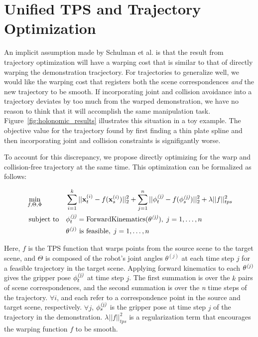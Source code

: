 \section{Unified TPS and Trajectory Optimization}
An implicit assumption made by Schulman et al. is that the result from trajectory optimization will have a warping cost that is similar to that of directly warping the demonstration tracjectory. For trajectories to generalize well, we would like the warping cost that registers both the scene correspondences \emph{and} the new trajectory to be smooth. If incorporating joint and collision avoidance into a trajectory deviates by too much from the warped demonstration, we have no reason to think that it will accomplish the same manipulation task. Figure~\ref{fig:holonomic_results} illustrates this situation in a toy example. The objective value for the trajectory found by first finding a thin plate spline and then incorporating joint and collision constraints is signifigantly worse.

To account for this discrepancy, we propose directly optimizing for the warp and collision-free trajectory at the same time. This optimization can be formalized as follows:

\begin{equation}
\begin{aligned}
  & \min_{f,\Theta,\Phi}
  & & \sum_{i=1}^k ||\mathbf{x}_t^{(i)} - f(\mathbf{x}_s^{(i)})||_2^2 + \sum_{j=1}^n ||\mathbf{\phi}_t^{\emph{(j)}} - f(\mathbf{\phi}_s^{\emph{(j)}})||_2^2 + \lambda ||f||_{tps}^2 \\
  & \text{ subject to}
  & & \mathbf{\phi}_t^{\emph{(j)}} = \text{ForwardKinematics}(\mathbf{\theta}^{\emph{(j)}}), \; j = 1, \ldots, n \\
  &
  & & \mathbf{\theta}^{\emph(j)} \text{ is feasible}, \; j = 1, \ldots, n
\end{aligned}
\end{equation}

Here, $f$ is the TPS function that warps points from the source scene to the target scene, and $\Theta$ is composed of the robot's joint angles $\theta^{(j)}$ at each time step $j$ for a feasible trajectory in the target scene. Applying forward kinematics to each $\mathbf{\theta}^{\emph(j)}$ gives the gripper pose $\mathbf{\phi}_t^{\emph{(j)}}$ at time step $j$. The first summation is over the $k$ pairs of scene correspondences, and the second summation is over the \emph{n} time steps of the trajectory. $\forall i$,  and  each refer to a correspondence point in the source and target scene, respectively. $\forall j$, $\mathbf{\phi}_s^{\emph{(j)}}$ is the gripper pose at time step $j$ of the trajectory in the demonstration. $\lambda ||f||_{tps}^2$ is a regularization term that encourages the warping function $f$ to be smooth.

